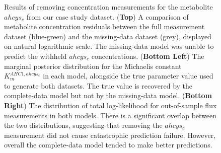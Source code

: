 \documentclass[journal=asbcd6,manuscript=article,layout=traditional]{achemso}
\begin{document}
\begin{figure}

\begin{minipage}[t]{\linewidth}

{\centering 


}

\end{minipage}%

\caption{\label{fig-missing}Results of removing concentration
measurements for the metabolite \(ahcys_c\) from our case study dataset.
(\textbf{Top}) A comparison of metabolite concentration residuals
between the full measurement dataset (blue-green) and the missing-data
dataset (grey), displayed on natural logarithmic scale. The missing-data
model was unable to predict the withheld \(ahcys_c\) concentrations.
(\textbf{Bottom Left}) The marginal posterior distribution for the
Michaelis constant \(K_m^{AHC1,ahcys_c}\) in each model, alongside the
true parameter value used to generate both datasets. The true value is
recovered by the complete-data model but not by the missing-data model.
(\textbf{Bottom Right}) The distribution of total log-likelihood for
out-of-sample flux measurements in both models. There is a significant
overlap between the two distributions, suggesting that removing the
\(ahcys_c\) measurement did not cause catastrophic prediction failure.
However, overall the complete-data model tended to make better
predictions.}

\end{figure}
\end{document}
